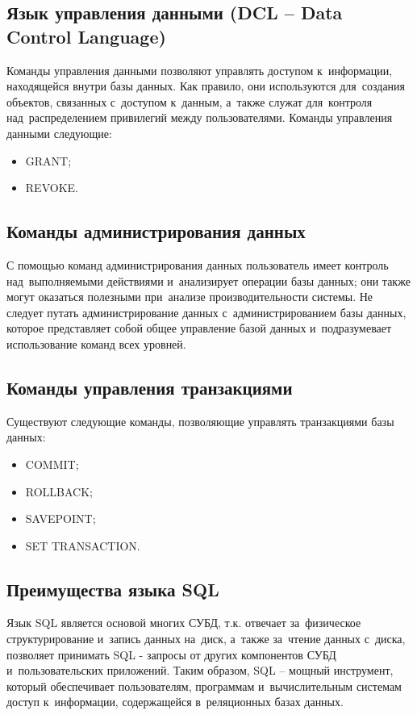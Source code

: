\documentclass{ou}
\begin{document}
\subsection{Язык управления данными (DCL -- Data Control Language)}
Команды управления данными позволяют управлять доступом к~информации, находящейся внутри базы данных. Как правило, они используются для~создания объектов, связанных с~доступом к~данным, а~также служат для~контроля над~распределением привилегий между пользователями. Команды управления данными следующие:

\begin{itemize}[label=-, leftmargin=0em, itemindent=3.35em, nosep]
\item GRANT;
\item REVOKE.
\end{itemize}

\subsection{Команды администрирования данных}
С помощью команд администрирования данных пользователь имеет контроль над~выполняемыми действиями и~анализирует операции базы данных; они также могут оказаться полезными при~анализе производительности системы. Не следует путать администрирование данных с~администрированием базы данных, которое представляет собой общее управление базой данных и~подразумевает использование команд всех уровней.

\subsection{Команды управления транзакциями}
Существуют следующие команды, позволяющие управлять транзакциями базы данных:

\begin{itemize}[label=-, leftmargin=0em, itemindent=3.35em, nosep]
\item COMMIT;
\item ROLLBACK;
\item SAVEPOINT;
\item SET TRANSACTION.
\end{itemize}

\subsection{Преимущества языка SQL}
Язык SQL является основой многих СУБД, т.к. отвечает за~физическое структурирование и~запись данных на~диск, а~также за~чтение данных с~диска, позволяет принимать SQL - запросы от других компонентов СУБД и~пользовательских приложений. Таким образом, SQL -- мощный инструмент, который обеспечивает пользователям, программам и~вычислительным системам доступ к~информации, содержащейся в~реляционных базах данных.
\end{document}
